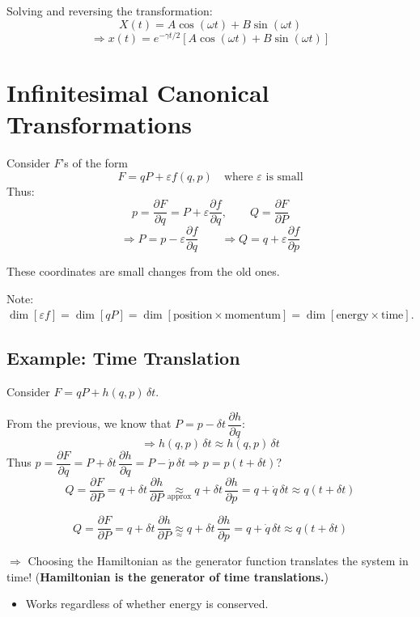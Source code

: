 Solving and reversing the transformation:
\[
    X(t) = A\cos(\omega t) + B\sin(\omega t)
\]
\[
    \Rightarrow x(t) = e^{-\gamma t/2}\!\left[A\cos(\omega t) + B\sin(\omega t)\right]
\]

\section{Infinitesimal Canonical Transformations}

Consider $F$'s of the form
\[
    F = qP + \varepsilon f(q,p) \quad \text{where } \varepsilon \text{ is small}
\]
Thus:
\[
    p = \frac{\partial F}{\partial q} = P + \varepsilon\frac{\partial f}{\partial q}, \qquad Q = \frac{\partial F}{\partial P}
\]
\[
    \Rightarrow P = p - \varepsilon\frac{\partial f}{\partial q} \qquad \Rightarrow Q = q + \varepsilon\frac{\partial f}{\partial p}
\]

These coordinates are small changes from the old ones.

Note: $\dim[\varepsilon f] = \dim[qP] = \dim[\text{position} \times \text{momentum}] = \dim[\text{energy} \times \text{time}]$.

\subsection*{Example: Time Translation}

Consider $F = qP + h(q,p)\,\delta t$.

From the previous, we know that $P = p - \delta t\,\dfrac{\partial h}{\partial q}$:
\[
    \Rightarrow h(q,p)\,\delta t \approx h(q,p)\,\delta t
\]
Thus $p = \dfrac{\partial F}{\partial q} = P + \delta t\,\dfrac{\partial h}{\partial q} = P - \dot{p}\,\delta t \Rightarrow p = p(t+\delta t)$?
\[
    Q = \frac{\partial F}{\partial P} = q + \delta t\,\frac{\partial h}{\partial P} \underset{\text{approx}}{\approx} q + \delta t\,\frac{\partial h}{\partial p} = q + \dot{q}\,\delta t \approx q(t+\delta t)
\]

\[
    Q = \frac{\partial F}{\partial P} = q + \delta t\,\frac{\partial h}{\partial P} \underset{\approx}{\approx} q + \delta t\,\frac{\partial h}{\partial p} = q + \dot{q}\,\delta t \approx \boxed{q(t+\delta t)}
\]

$\Rightarrow$ Choosing the Hamiltonian as the generator function translates the system in time! (\textbf{Hamiltonian is the generator of time translations.})
\begin{itemize}
    \item Works regardless of whether energy is conserved.
\end{itemize}

